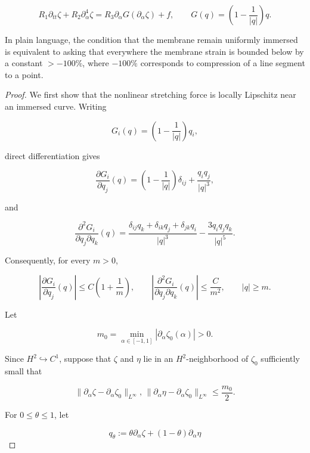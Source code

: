 \documentclass[10pt,a4paper]{amsart}
\begin{document}
\begin{equation}
R_1\partial_{tt}\zeta+R_2\partial_\alpha^4\zeta
=
R_3\partial_\alpha G(\partial_\alpha\zeta)+f,
\qquad
G(q)=\left(1-\frac{1}{|q|}\right)q.
\label{positive-R2-evolution}
\end{equation}

\begin{remark}
    In plain language, the condition that the membrane remain uniformly immersed is equivalent to asking that everywhere the membrane strain is bounded below by a constant $> -100\%$, where $-100\%$ corresponds to compression of a line segment to a point. 
\end{remark}

\begin{proof}
We first show that the nonlinear stretching force is locally Lipschitz near an immersed curve. Writing

$$
    G_i(q)=\left(1-\frac{1}{|q|}\right)q_i,
$$

direct differentiation gives

$$
    \frac{\partial G_i}{\partial q_j}(q)
    =
    \left(1-\frac{1}{|q|}\right)\delta_{ij}
    +\frac{q_iq_j}{|q|^3},
$$

and

$$
    \frac{\partial^2G_i}{\partial q_j\partial q_k}(q)
    =
    \frac{
        \delta_{ij}q_k+\delta_{ik}q_j+\delta_{jk}q_i
    }{|q|^3}
    -
    \frac{3q_iq_jq_k}{|q|^5}.
$$

Consequently, for every \(m>0\),

$$
    \left|
        \frac{\partial G_i}{\partial q_j}(q)
    \right|
    \leq C\left(1+\frac1m\right),
    \qquad
    \left|
        \frac{\partial^2G_i}{\partial q_j\partial q_k}(q)
    \right|
    \leq \frac{C}{m^2},
    \qquad |q|\geq m.
$$

Let

$$
    m_0=\min_{\alpha\in[-1,1]}
    |\partial_\alpha\zeta_0(\alpha)|>0.
$$

Since $H^2 \hookrightarrow C^1$, suppose that \(\zeta\) and \(\eta\) lie in an \(H^2\)-neighborhood of \(\zeta_0\) sufficiently small that

$$
    \|\partial_\alpha\zeta-\partial_\alpha\zeta_0\|_{L^\infty},
    \,
    \|\partial_\alpha\eta-\partial_\alpha\zeta_0\|_{L^\infty}
    \leq \frac{m_0}{2}.
$$

For \(0\leq\theta\leq1\), let

$$
    q_\theta
    :=
    \theta\partial_\alpha\zeta
    +(1-\theta)\partial_\alpha\eta
$$


\end{proof}
\end{document}
